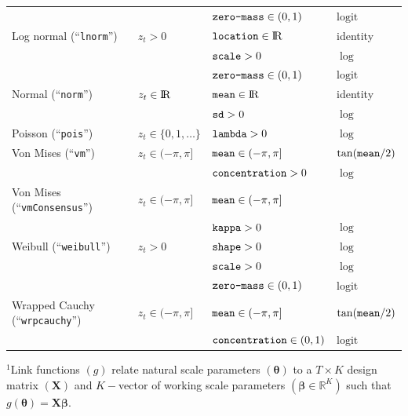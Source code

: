 \documentclass[12pt]{article}\usepackage[]{graphicx}\usepackage[]{color}
\begin{document}
\begin{table}
\begin{tabular}{llll}
                                              &                          & $\verb|zero-mass|\in(0,1)$       &  $\text{logit}$ \tabularnewline 
  Log normal (``\verb|lnorm|'')               & $z_t>0$                  & $\verb|location|\in{\rm I\!R}$   &  identity \tabularnewline  
                                              &                          & $\verb|scale|>0$                 &  $\log$ \tabularnewline  
                                              &                          & $\verb|zero-mass|\in(0,1)$       &  $\text{logit}$ \tabularnewline 
  Normal (``\verb|norm|'')                    & $z_t\in{\rm I\!R}$       & $\verb|mean|\in{\rm I\!R}$       &  identity \tabularnewline  
                                              &                          & $\verb|sd|>0$                    &  $\log$ \tabularnewline 
  Poisson (``\verb|pois|'')                   & $z_t\in\{0,1,\ldots\}$   & $\verb|lambda|>0$                &  $\log$ \tabularnewline  
  Von Mises (``\verb|vm|'')                   & $z_t\in(-\pi,\pi]$       & $\verb|mean|\in(-\pi,\pi]$       &  $\tan(\verb|mean|/2)$ \tabularnewline  
                                              &                          & $\verb|concentration|>0$         &  $\log$ \tabularnewline 
  Von Mises (``\verb|vmConsensus|'')          & $z_t\in(-\pi,\pi]$       & $\verb|mean|\in(-\pi,\pi]$       &  \cite{RivestEtAl2016} \tabularnewline  
                                              &                          & $\verb|kappa|>0$                 &  $\log$ \tabularnewline 
  Weibull (``\verb|weibull|'')                & $z_t>0$                  & $\verb|shape|>0$                 &  $\log$ \tabularnewline  
                                              &                          & $\verb|scale|>0$                 &  $\log$ \tabularnewline  
                                              &                          & $\verb|zero-mass|\in(0,1)$       &  $\text{logit}$ \tabularnewline 
  Wrapped Cauchy (``\verb|wrpcauchy|'')       & $z_t\in(-\pi,\pi]$       & $\verb|mean|\in(-\pi,\pi]$       &  $\tan(\verb|mean|/2)$ \tabularnewline  
                                              &                          & $\verb|concentration|\in(0,1)$   &  $\text{logit}$ \tabularnewline 
  \bottomrule
  \end{tabular}
  \footnotesize{$^1$Link functions $(g)$ relate natural scale parameters $({\boldsymbol \theta})$ to a $T \times K$ design matrix $({\mathbf X})$ and $K-$vector of working scale parameters $(\boldsymbol{\beta}\in \mathbb{R}^K)$ such that $g({\boldsymbol \theta})={\mathbf X}\boldsymbol{\beta}$. %
}
\end{table}
\end{document}
